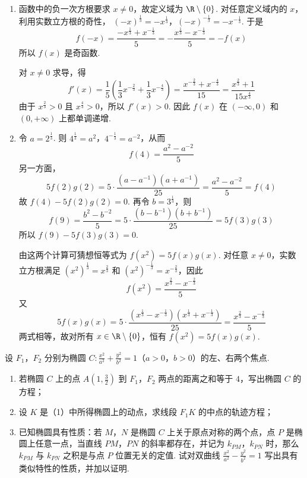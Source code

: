 \begin{solution}
\begin{enumerate}
\item 函数中的负一次方根要求 \(x\ne0\)，故定义域为 \(\R\mathbin{\backslash}\{0\}\). 对任意定义域内的 \(x\)，利用实数立方根的奇性，
\((-x)^{\frac{1}{3}}=-x^{\frac{1}{3}}\)，\((-x)^{-\frac{1}{3}}=-x^{-\frac{1}{3}}\).
于是
\[
f(-x)=\frac{-x^{\frac{1}{3}}+x^{-\frac{1}{3}}}{5}=-\frac{x^{\frac{1}{3}}-x^{-\frac{1}{3}}}{5}=-f(x)
\]
所以 \(f(x)\) 是奇函数.

对 \(x\ne0\) 求导，得
\[
f'(x)=\frac{1}{5}\left(\frac{1}{3}x^{-\frac{2}{3}}+\frac{1}{3}x^{-\frac{4}{3}}\right)
=\frac{x^{-\frac{2}{3}}+x^{-\frac{4}{3}}}{15}
=\frac{x^{\frac{2}{3}}+1}{15x^{\frac{4}{3}}}
\]
由于 \(x^{\frac{2}{3}}>0\) 且 \(x^{\frac{4}{3}}>0\)，所以 \(f'(x)>0\). 因此 \(f(x)\) 在 \((-\infty,0)\) 和 \((0,+\infty)\) 上都单调递增.

\item 令 \(a=2^{\frac{1}{3}}\). 则 \(4^{\frac{1}{3}}=a^2\)，\(4^{-\frac{1}{3}}=a^{-2}\)，从而
\[
f(4)=\frac{a^2-a^{-2}}{5}
\]
另一方面，
\[
5f(2)g(2)=5\cdot\frac{(a-a^{-1})(a+a^{-1})}{25}
=\frac{a^2-a^{-2}}{5}=f(4)
\]
故 \(f(4)-5f(2)g(2)=0\). 再令 \(b=3^{\frac{1}{3}}\)，则
\[
f(9)=\frac{b^2-b^{-2}}{5}
=5\cdot\frac{(b-b^{-1})(b+b^{-1})}{25}
=5f(3)g(3)
\]
所以 \(f(9)-5f(3)g(3)=0\).

由这两个计算可猜想恒等式为 \(f(x^2)=5f(x)g(x)\). 对任意 \(x\ne0\)，实数立方根满足 \((x^2)^{\frac{1}{3}}=x^{\frac{2}{3}}\) 和 \((x^2)^{-\frac{1}{3}}=x^{-\frac{2}{3}}\)，因此
\[
f(x^2)=\frac{x^{\frac{2}{3}}-x^{-\frac{2}{3}}}{5}
\]
又
\[
5f(x)g(x)=5\cdot\frac{(x^{\frac{1}{3}}-x^{-\frac{1}{3}})(x^{\frac{1}{3}}+x^{-\frac{1}{3}})}{25}
=\frac{x^{\frac{2}{3}}-x^{-\frac{2}{3}}}{5}
\]
两式相等，故对所有 \(x\in\R\mathbin{\backslash}\{0\}\)，恒有 \(f(x^2)=5f(x)g(x)\).
\end{enumerate}
\end{solution}

\begin{problem}
设 \(F_{1}\)，\(F_{2}\) 分别为椭圆 \(C: \frac{x^{2}}{a^{2}} + \frac{y^{2}}{b^{2}} = 1\)（\(a > 0\)，\(b > 0\)）的左、右两个焦点.

\begin{enumerate}
\item 若椭圆 \(C\) 上的点 \(A\left(1,\frac{3}{2}\right)\) 到 \(F_{1}\)，\(F_{2}\) 两点的距离之和等于 \(4\)，写出椭圆 \(C\) 的方程；
\item 设 \(K\) 是（1）中所得椭圆上的动点，求线段 \(F_{1}K\) 的中点的轨迹方程；
\item 已知椭圆具有性质：若 \(M\)，\(N\) 是椭圆 \(C\) 上关于原点对称的两个点，点 \(P\) 是椭圆上任意一点，当直线 \(PM\)，\(PN\) 的斜率都存在，并记为 \(k_{PM}\)，\(k_{PN}\) 时，那么 \(k_{PM}\) 与 \(k_{PN}\) 之积是与点 \(P\) 位置无关的定值. 试对双曲线 \(\frac{x^{2}}{a^{2}} - \frac{y^{2}}{b^{2}} = 1\) 写出具有类似特性的性质，并加以证明.
\end{enumerate}
\end{problem}

